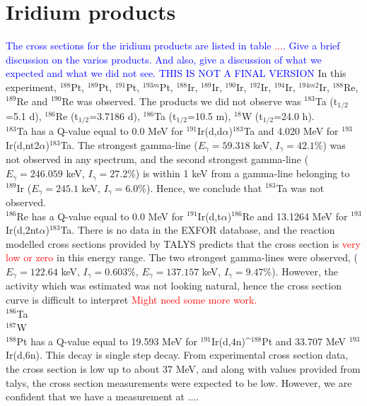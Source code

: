 \documentclass[a4paper,11pt,twoside]{book}
\begin{document}
\section{Iridium products}

\noindent \textcolor{blue}{The cross sections for the iridium products are listed in table \textcolor{red}{...}. Give a brief discussion on the varios products. And also, give a discussion of what we expected and what we did not see. THIS IS NOT A FINAL VERSION } In this experiment, $^{188}$Pt, $^{189}$Pt, $^{191}$Pt, $^{193m}$Pt, $^{188}$Ir, $^{189}$Ir, $^{190}$Ir, $^{192}$Ir, $^{194}$Ir, $^{194m2}$Ir, $^{188}$Re, $^{189}$Re and $^{190}$Re was observed. The products we did not observe was $^{183}$Ta (t$_{1/2}$=5.1 d), $^{186}$Re (t$_{1/2}$=3.7186 d), $^{186}$Ta (t$_{1/2}$=10.5 m), $^{18}$W (t$_{1/2}$=24.0 h). \\

\noindent $^{183}$Ta has a Q-value equal to 0.0 MeV for $^{191}$Ir(d,d$\alpha$)$^{183}$Ta and 4.020 MeV for $^{193}$Ir(d,nt2$\alpha$)$^{183}$Ta. The strongest gamma-line ($E_\gamma=59.318$ keV, $I_\gamma=42.1\%$) was not observed in any spectrum, and the second strongest gamma-line ($E_\gamma=246.059$ keV, $I_\gamma=27.2\%$) is within 1 keV from a gamma-line belonging to $^{189}$Ir ($E_\gamma=245.1$ keV, $I_\gamma=6.0\%$). Hence, we conclude that $^{183}$Ta was not observed. \\

\noindent $^{186}$Re has a Q-value equal to 0.0 MeV for $^{191}$Ir(d,t$\alpha$)$^{186}$Re and 13.1264 MeV for $^{193}$Ir(d,2nt$\alpha$)$^{183}$Ta. There is no data in the EXFOR database, and the reaction modelled cross sections provided by TALYS predicts that the cross section is \textcolor{red}{very low or zero} in this energy range. The two strongest gamma-lines were observed, ($E_\gamma=122.64$ keV, $I_\gamma=0.603\%$, $E_\gamma=137.157$ keV, $I_\gamma=9.47\%$). However, the activity which was estimated was not looking natural, hence the cross section curve is difficult to interpret \textcolor{red}{Might need some more work.} \\ 

\noindent $^{186}$Ta \\

\noindent $^{187}$W  \\

\noindent $^{188}$Pt has a Q-value equal to 19.593 MeV for $^{191}$Ir(d,4n)^$^{188}$Pt and 33.707 MeV $^{193}$Ir(d,6n). This decay is single step decay.  From experimental cross section data, the cross section is low up to about 37 MeV, and along with values provided from talys, the cross section measurements were expected to be low. However, we are confident that we have a measurement at .... 
\end{document}
